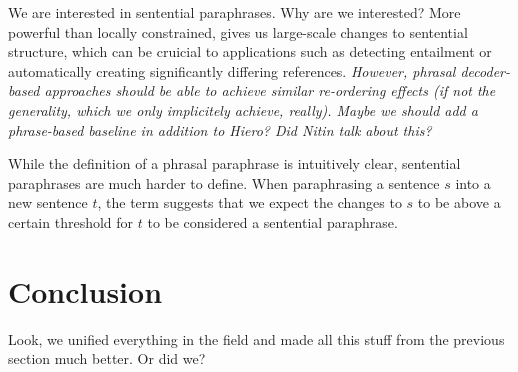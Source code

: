 \documentclass[11pt]{article}
\begin{document}
We are interested in sentential paraphrases. Why are we interested?
More powerful than locally constrained, gives us large-scale changes
to sentential structure, which can be cruicial to applications such as
detecting entailment or automatically creating significantly differing
references. \emph{However, phrasal decoder-based approaches should be
  able to achieve similar re-ordering effects (if not the generality,
  which we only implicitely achieve, really). Maybe we should add a
  phrase-based baseline in addition to Hiero? Did Nitin talk about
  this?}

While the definition of a phrasal paraphrase is intuitively clear,
sentential paraphrases are much harder to define. When paraphrasing a
sentence $s$ into a new sentence $t$, the term suggests that we expect
the changes to $s$ to be above a certain threshold for $t$ to be
considered a sentential paraphrase. 

\newpage

\section{Conclusion} \label{conclusion}

Look, we unified everything in the field and made all this stuff from
the previous section much better. Or did we?

\newpage




\nocite{*}
\end{document}
